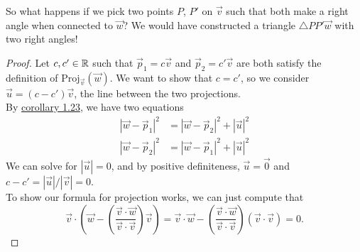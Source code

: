 So what happens if we pick two points $P$, $P'$ on $\vec{v}$ such that both make a right angle when connected to $\vec{w}$? We would have constructed a triangle $\triangle PP'\vec{w}$ with two right angles!
\begin{proof}
	Let $c, c'\in\mathbb{R}$ such that $\vec{p}_1=c\vec{v}$ and $\vec{p}_2=c'\vec{v}$ are both satisfy the definition of $\textrm{Proj}_{\vec{v}}({\vec{w}})$. We want to show that $c=c'$, so we consider $\vec{u}=(c-c')\vec{v}$, the line between the two projections.\\
	By \hyperref[dotproductcor]{corollary 1.23}, we have two equations \begin{align*}
	|\vec{w}-\vec{p}_1|^2&=|\vec{w}-\vec{p}_2|^2+|\vec{u}|^2 \\	
	|\vec{w}-\vec{p}_2|^2&=|\vec{w}-\vec{p}_1|^2+|\vec{u}|^2 
	\end{align*}
	We can solve for $|\vec{u}|=0$, and by positive definiteness, $\vec{u}=\vec{0}$ and $c-c' = |\vec{u}|/|\vec{v}| =0$.\\
	To show our formula for projection works, we can just compute that \[
	\vec{v} \cdot \left(\vec{w}-\left(\frac{\vec{v}\cdot{\vec{w}}}{\vec{v}\cdot\vec{v}}\right)\vec{v}\right)=\vec{v}\cdot\vec{w} -\left(\frac{\vec{v}\cdot\vec{w}}{\vec{v}\cdot\vec{v}}\right)(\vec{v}\cdot\vec{v})=0.
	\]
\end{proof}
\exercises

